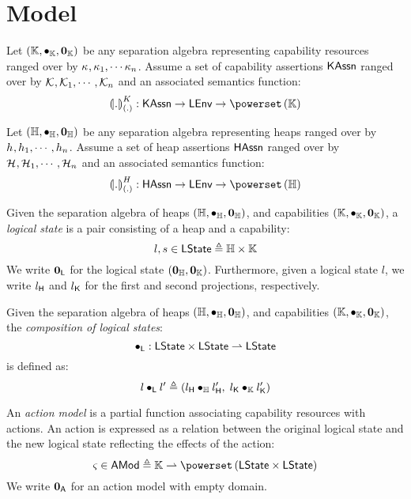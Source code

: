\section*{Model}
\begin{parameter}
Let $\left(\mathbb{K}, \bullet_{\mathbb{K}}, \mathbf{0}_{\mathbb{K}}\right)$ be any separation algebra representing capability resources ranged over by $\kappa_{}, \kappa_{1}, \cdots  \kappa_{n}$. Assume a set of capability assertions $\textsf{KAssn}$ ranged over by $\mathcal{K}_{}, \mathcal{K}_{1}, \cdots, \mathcal{K}_{n}$ and an associated semantics function:
%
\[
	\semK[\blankArg]{.} : \KAssertions \rightarrow \LEnv \rightarrow \pset{\Caps}
\]
%
\end{parameter}
%
%
\begin{parameter}
Let $(\mathbb{H}, \bullet_{\mathbb{H}}, \mathbf{0}_{\mathbb{H}})$ be any separation algebra representing heaps ranged over by $h_{}, h_{1}, \cdots, h_{n}$. Assume a set of heap assertions $\textsf{HAssn}$ ranged over by $\mathcal{H}_{}, \mathcal{H}_{1}, \cdots, \mathcal{H}_{n}$ and an associated semantics function:
%
\[
	\semH[\blankArg]{.} : \HAssertions \rightarrow \LEnv \rightarrow \pset{\Heaps}
\]
%
\end{parameter}
%
%
\begin{definition}
Given the separation algebra of heaps $(\mathbb{H}, \bullet_{\mathbb{H}}, \mathbf{0}_{\mathbb{H}})$, and capabilities $\left(\mathbb{K}, \bullet_{\mathbb{K}}, \mathbf{0}_{\mathbb{K}}\right)$, a \emph{logical state} is a pair consisting of a heap and a capability:
%
\[
	l, s \in \textsf{LState} \triangleq \mathbb{H} \times \mathbb{K}
\]
%
We write $\mathbf{0}_{\textsf{L}}$ for the logical state $(\mathbf{0}_{\mathbb{H}}, \mathbf{0}_{\mathbb{K}})$. Furthermore, given a logical state $l$, we write $l_{\textsf{H}}$ and $l_{\textsf{K}}$ for the first and second projections, respectively.
\end{definition}
%
%
\begin{definition}
Given the separation algebra of heaps $(\mathbb{H}, \bullet_{\mathbb{H}}, \mathbf{0}_{\mathbb{H}})$, and capabilities $\left(\mathbb{K}, \bullet_{\mathbb{K}}, \mathbf{0}_{\mathbb{K}}\right)$, the \emph{composition of logical states}:
%
\[
	\bullet_{\textsf{L}} : \textsf{LState} \times \textsf{LState} \rightharpoonup \textsf{LState}
\]
%
is defined as:
%
\[
	l \bullet_{\textsf{L}} l' \triangleq (l_{\textsf{H}} \bullet_{\mathbb{H}} l'_{\textsf{H}},\; l_{\textsf{K}} \bullet_{\mathbb{K}} l'_{\textsf{K}})
\]
%
\end{definition}
%
%
\begin{definition}
An \emph{action model} is a partial function associating capability resources with actions. An action is expressed as a relation between the original logical state and the new logical state reflecting the effects of the action:
%
\[
	\amod{} \in \AMods \eqdef \Caps \rightharpoonup \pset{\LState \times \LState}
\]
%
We write $\mathbf{0}_{\textsf{A}}$ for an action model with empty domain.
\end{definition}
